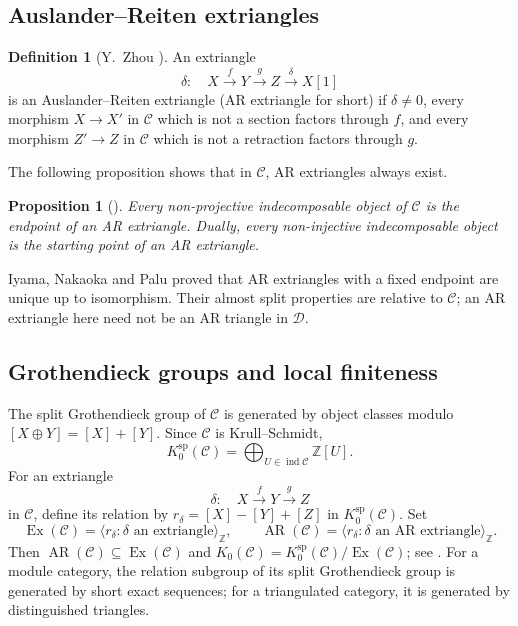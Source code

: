 \documentclass[pdflatex,sn-mathphys-num]{sn-jnl}
\numberwithin{equation}{section}
\newtheorem{proposition}[theorem]{Proposition}
\theoremstyle{definition}
\newtheorem{definition}[theorem]{Definition}
\theoremstyle{remark}\newtheorem{remark}[theorem]{Remark}
\newcommand{\C}{\mathcal C}
\newcommand{\D}{\mathcal D}
\newcommand{\ind}{\operatorname{ind}}
\newcommand{\Ex}{\operatorname{Ex}}
\newcommand{\AR}{\operatorname{AR}}
\newcommand{\ksp}{K_0^{\mathrm{sp}}}
\begin{document}
\subsection{Auslander--Reiten extriangles}
\begin{definition}[{Y.~Zhou \cite[Definition 3.3]{Zhou}}]
An extriangle
\begin{equation}\label{eq:triangle}
 \delta:\quad X\xrightarrow fY\xrightarrow gZ\xrightarrow\delta X[1]
\end{equation}
is an Auslander--Reiten extriangle (AR extriangle for short) if $\delta\ne0$, every morphism
$X\to X'$ in $\C$ which is not a section factors through $f$, and every
morphism $Z'\to Z$ in $\C$ which is not a retraction factors through $g$.
\end{definition}
The following proposition shows that in $\C$, AR extriangles always exist.

\begin{proposition}[{\cite[Theorem 3.12]{Zhou}}]\label{prop:ARexists}
Every non-projective indecomposable object of $\C$ is the endpoint of an
AR extriangle. Dually, every non-injective indecomposable
object is the starting point of an AR extriangle.
\end{proposition}

Iyama, Nakaoka and Palu \cite[Proposition 2.6]{INP} proved that
AR extriangles with a fixed endpoint are unique up to isomorphism. Their almost split properties are relative
to $\C$; an AR extriangle here need not be an AR triangle in $\D$.

\subsection{Grothendieck groups and local finiteness}
The split Grothendieck group of $\C$ is generated by object classes modulo
$[X\oplus Y]=[X]+[Y]$. Since $\C$ is Krull--Schmidt,
\[
 \ksp(\C)=\bigoplus_{U\in\ind\C}\mathbb Z[U].
\]
For an extriangle
\[
 \delta:\quad X\xrightarrow fY\xrightarrow gZ
\]
in $\C$, define its relation by $r_\delta=[X]-[Y]+[Z]$ in
$\ksp(\C)$. Set
\[
 \Ex(\C)=\langle r_\delta:\delta\text{ an extriangle}\rangle_{\mathbb Z},
 \qquad
 \AR(\C)=\langle r_\delta:\delta\text{ an AR extriangle}\rangle_{\mathbb Z}.
\]
Then $\AR(\C)\subseteq\Ex(\C)$ and
$K_0(\C)=\ksp(\C)/\Ex(\C)$; see \cite[Section 4]{ZZ}.
For a module category, the relation subgroup of its split
Grothendieck group is generated by short exact sequences; for a
triangulated category, it is generated by distinguished triangles.
\end{document}
